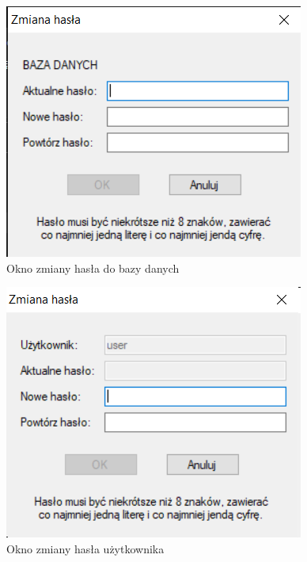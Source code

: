 \begin{figure}[htb]
	\centering
	\includegraphics{obrazki/Logowanie/zmiana_hasla_bazy.png}
	\caption{Okno zmiany hasła do bazy danych}
	\label{zmianaHaslaBazy}
\end{figure}

\begin{figure}[htb]
	\centering
	\includegraphics{obrazki/Logowanie/zmiana_hasla_uzytkownika.png}
	\caption{Okno zmiany hasła użytkownika}
	\label{zmianaHaslaUzytkownika}
\end{figure}
